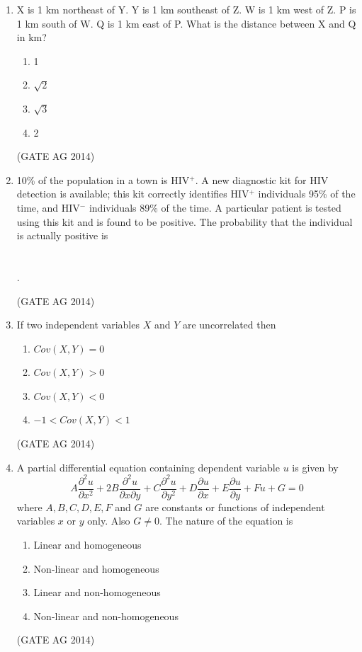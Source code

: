 \documentclass[journal,12pt,onecolumn]{IEEEtran}
\begin{document}
\begin{enumerate}
    \item X is 1 km northeast of Y. Y is 1 km southeast of Z. W is 1 km west of Z. P is 1 km south of W. Q is 1 km east of P. What is the distance between X and Q in km?
    \begin{multicols}{4}
    \begin{enumerate}
        \item 1
        \item $\sqrt{2}$
        \item $\sqrt{3}$
        \item 2
    \end{enumerate}
    \end{multicols}
    \hfill(GATE AG 2014)

    \item 10\% of the population in a town is HIV$^+$. A new diagnostic kit for HIV detection is available; this kit correctly identifies HIV$^+$ individuals 95\% of the time, and HIV$^-$ individuals 89\% of the time. A particular patient is tested using this kit and is found to be positive. The probability that the individual is actually positive is \\\\\\.

    \hfill(GATE AG 2014)

    \item If two independent variables $X$ and $Y$ are uncorrelated then
    \begin{multicols}{2}
    \begin{enumerate}
        \item $Cov(X,Y) = 0$
        \item $Cov(X,Y) > 0$
        \item $Cov(X,Y) < 0$
        \item $-1 < Cov(X,Y) < 1$
    \end{enumerate}
    \end{multicols}
    \hfill(GATE AG 2014)

    \item A partial differential equation containing dependent variable $u$ is given by
    \[A \frac{\partial^2 u}{\partial x^2} + 2B \frac{\partial^2 u}{\partial x \partial y} + C \frac{\partial^2 u}{\partial y^2} + D \frac{\partial u}{\partial x} + E \frac{\partial u}{\partial y} + F u + G = 0\]
    where $A, B, C, D, E, F$ and $G$ are constants or functions of independent variables $x$ or $y$ only. Also $G \neq 0$. The nature of the equation is
    \begin{multicols}{2}
    \begin{enumerate}
        \item Linear and homogeneous
        \item Non-linear and homogeneous
        \item Linear and non-homogeneous
        \item Non-linear and non-homogeneous
    \end{enumerate}
    \end{multicols}
    \hfill(GATE AG 2014)


\end{enumerate}
\end{document}

